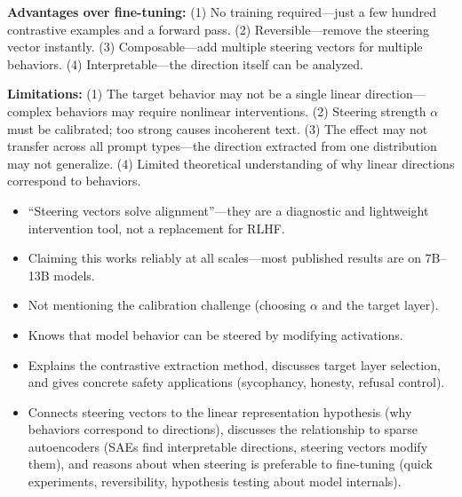 \begin{interviewq}
\textbf{Advantages over fine-tuning:} (1) No training required---just a few hundred contrastive examples and a forward pass. (2) Reversible---remove the steering vector instantly. (3) Composable---add multiple steering vectors for multiple behaviors. (4) Interpretable---the direction itself can be analyzed.

\textbf{Limitations:} (1) The target behavior may not be a single linear direction---complex behaviors may require nonlinear interventions. (2) Steering strength $\alpha$ must be calibrated; too strong causes incoherent text. (3) The effect may not transfer across all prompt types---the direction extracted from one distribution may not generalize. (4) Limited theoretical understanding of why linear directions correspond to behaviors.

\redflags
\begin{itemize}
    \item ``Steering vectors solve alignment''---they are a diagnostic and lightweight intervention tool, not a replacement for RLHF.
    \item Claiming this works reliably at all scales---most published results are on 7B--13B models.
    \item Not mentioning the calibration challenge (choosing $\alpha$ and the target layer).
\end{itemize}


\goodgreat
\begin{itemize}
    \item {} Knows that model behavior can be steered by modifying activations.
    \item {} Explains the contrastive extraction method, discusses target layer selection, and gives concrete safety applications (sycophancy, honesty, refusal control).
    \item {} Connects steering vectors to the linear representation hypothesis (why behaviors correspond to directions), discusses the relationship to sparse autoencoders (SAEs find interpretable directions, steering vectors modify them), and reasons about when steering is preferable to fine-tuning (quick experiments, reversibility, hypothesis testing about model internals).
\end{itemize}

\end{interviewq}
